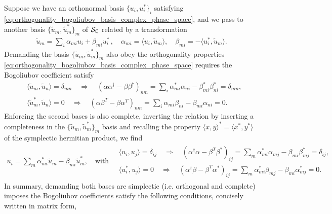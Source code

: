 \documentclass[../QFT_main.tex]{subfiles}
\begin{document}
\begin{mytheorem}
Suppose we have an orthonormal basis $\{u_i, u_i^*\}_i$ satisfying \eqref{eq:orthogonality_bogoliubov_basis_complex_phase_space}, and we pass to another basis $\{\tilde{u}_m, \tilde{u}_m^*\}_m$ of $\mathcal{S}_{\mathbb{C}}$ related by a transformation
\begin{align}\label{eq:transformation_bogoliubov_modes}
    \tilde{u}_m = \sum_i \alpha_{mi} u_i + \beta_{mi} u_i^*\,,\quad \alpha_{mi}=\langle u_i, \tilde{u}_m\rangle, \quad \beta_{mi} = -\langle u_i^*, \tilde{u}_m\rangle.
\end{align}
Demanding the basis $\{\tilde{u}_m, \tilde{u}_m^*\}_m$ also obey the orthogonality properties \eqref{eq:orthogonality_bogoliubov_basis_complex_phase_space} requires the Bogoliubov coefficient satisfy
{\small\begin{align}\label{eq:orthogonality_condition_bogoliubov_coefficients}
    &\langle \tilde{u}_m, \tilde{u}_{n} \rangle = \delta_{mn} \quad \Rightarrow \quad (\alpha \alpha^\dagger- \beta\beta^\dagger)_{nm}=\sum_i \alpha_{mi}^* \alpha_{ni} - \beta_{mi}^* \beta_{ni}^* = \delta_{mn},\\
    &\langle \tilde{u}_m^*, \tilde{u}_{n} \rangle = 0 \quad \Rightarrow \quad (\alpha\beta^T-\beta\alpha^T)_{nm}=\sum_i \alpha_{mi} \beta_{ni} - \beta_{mi} \alpha_{ni} = 0.
\end{align}}
Enforcing the second bases is also complete, inverting the relation by inserting a completeness in the $\{\tilde{u}_m, \tilde{u}_m^*\}_m$ basis and recalling the property $\langle x,y\rangle^* = \langle x^*,y^*\rangle$ of the symplectic hermitian product, we find 
{\small\begin{align}\label{eq:inverse_transformation_bogoliubov_modes}
    u_i= \sum_m \alpha_{mi}^* \tilde{u}_m - \beta_{mi} \tilde{u}_m^*,\quad \text{with}\quad
    \begin{array}{c}
    \langle u_i, u_j \rangle = \delta_{ij} \quad \Rightarrow \quad (\alpha^\dagger \alpha - \beta^T \beta^*)_{ij} = \sum_m \alpha_{mi}^* \alpha_{mj} - \beta_{mi} \beta_{mj}^* = \delta_{ij},\\[2pt]
    \langle u_i^*, u_j \rangle = 0 \quad \Rightarrow \quad (\alpha^\dagger \beta - \beta^T \alpha^*)_{ij} = \sum_m \alpha_{mi}^* \beta_{mj} - \beta_{mi} \alpha_{mj}^* = 0.
    \end{array}
\end{align}}
In summary, demanding both bases are simplectic (i.e. orthogonal and complete) imposes the Bogoliubov coefficients satisfy the following conditions, concisely written in matrix form,
{\small
\begin{align}\label{eq:bogol_transform_mode_function_matrix_form_classical}

\end{align}}
\end{mytheorem}
\end{document}
